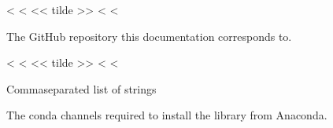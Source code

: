 \documentclass[letterpaper,10pt,english]{sphinxmanual}
\begin{document}

\vspace{5px}

\begin{fulllineitems}
\label{\detokenize{confval:confval-github_repository}}
<%
\pysigstartsignatures
<%
<< tilde >>
<%
<%
\vspace{-45px}

\begin{DUlineblock}{0em}
\item[]  
\item[]  
\end{DUlineblock}

\vspace{-25px}

The GitHub repository this documentation corresponds to.

\end{fulllineitems}


\vspace{5px}

\begin{fulllineitems}
\label{\detokenize{confval:confval-conda_channels}}
<%
\pysigstartsignatures
<%
<< tilde >>
<%
<%
\vspace{-45px}

\begin{DUlineblock}{0em}
\item[]  Comma\sphinxhyphen{}separated list of strings
\item[]  
\end{DUlineblock}

\vspace{-25px}

The conda channels required to install the library from Anaconda.

\end{fulllineitems}
\end{document}
